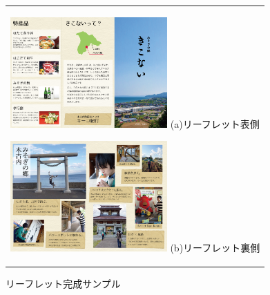 \begin{figure}[htbp]
  \begin{center}
    \begin{tabular}{c}
      \begin{minipage}{0.33\hsize}
        \begin{center}
\includegraphics[width=6cm, bb=0 0 640 1104]{リーフレットオモテ.png}
	\hspace{1cm} (a)リーフレット表側
        \end{center}
      \end{minipage}

      \begin{minipage}{0.33\hsize}
        \begin{center}
\includegraphics[width=6cm, bb=0 0 642 1094]{リーフレットウラ.png}
      	\hspace{1cm} (b)リーフレット裏側
	\end{center}
      \end{minipage}

    \end{tabular}
  \end{center}
\addtocounter{figure}{+0}
 \caption{リーフレット完成サンプル}
\end{figure}

